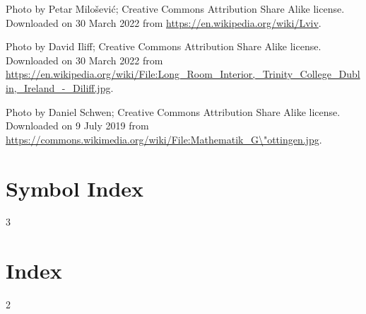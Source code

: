 \begin{Itemize}
 Photo by Petar Milo\v{s}evi\'c; Creative Commons Attribution Share Alike license. Downloaded on 30 March 2022 from
\url{https://en.wikipedia.org/wiki/Lviv}.

 Photo by David Iliff; Creative Commons Attribution Share Alike license. Downloaded on 30 March 2022 from\\[-2bp]
{\scriptsizer\url{https://en.wikipedia.org/wiki/File:Long\_Room\_Interior,\_Trinity\_College\_Dublin,\_Ireland\_-\_Diliff.jpg}}.


 Photo by Daniel Schwen; Creative Commons Attribution Share Alike license. Downloaded on 9 July 2019 from \url{https://commons.wikimedia.org/wiki/File:Mathematik\_G\"ottingen.jpg}.

\end{Itemize}

\chapter{Symbol Index}

\makeatletter
\renewcommand{\theindex}{\let\item\@idxitem}
\makeatother

\vspace{-.3in} %

\begin{multicols}{3}

{\addtolength{\baselineskip}{.47ex} %
}

\end{multicols}

\chapter{Index}

{\raggedright

\vspace{-.3in} %

\begin{multicols}{2}

{\addtolength{\baselineskip}{.0183in} %
}

\end{multicols}
}


